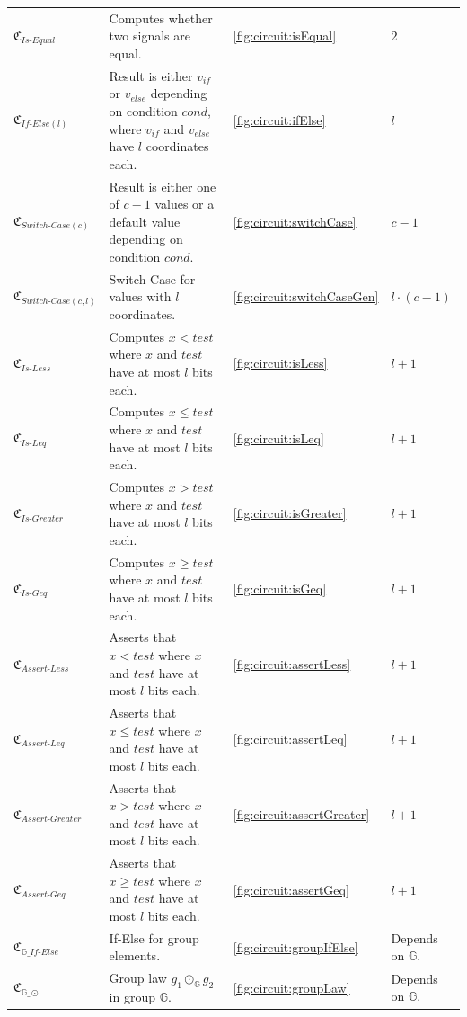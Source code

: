 \begin{longtable}{|L{4cm}|L{5.5cm}|L{1.3cm}|L{3cm}|}
    \hline
    $\mathfrak{C}_{Is\text{-}Equal}$ & Computes whether two signals are equal. & \cref{fig:circuit:isEqual} & $2$\\
    $\mathfrak{C}_{If\text{-}Else(l)}$ & Result is either $v_{if}$ or $v_{else}$ depending on condition $cond$, where $v_{if}$ and $v_{else}$ have $l$ coordinates each. & \cref{fig:circuit:ifElse} & $l$\\
    $\mathfrak{C}_{Switch\text{-}Case(c)}$ & Result is either one of $c-1$ values or a default value depending on condition $cond$. & \cref{fig:circuit:switchCase} & $c-1$\\
    $\mathfrak{C}_{Switch\text{-}Case(c,l)}$ & Switch-Case for values with $l$ coordinates. & \cref{fig:circuit:switchCaseGen} & $l\cdot(c-1)$\\
    $\mathfrak{C}_{Is\text{-}Less}$ & Computes $x<test$ where $x$ and $test$ have at most $l$ bits each. & \cref{fig:circuit:isLess} & $l+1$\\
    $\mathfrak{C}_{Is\text{-}Leq}$ & Computes $x\leq test$ where $x$ and $test$ have at most $l$ bits each. & \cref{fig:circuit:isLeq} & $l+1$\\
    $\mathfrak{C}_{Is\text{-}Greater}$ & Computes $x>test$ where $x$ and $test$ have at most $l$ bits each. & \cref{fig:circuit:isGreater} & $l+1$\\
    $\mathfrak{C}_{Is\text{-}Geq}$ & Computes $x\geq test$ where $x$ and $test$ have at most $l$ bits each. & \cref{fig:circuit:isGeq} & $l+1$\\
    $\mathfrak{C}_{Assert\text{-}Less}$ & Asserts that $x<test$ where $x$ and $test$ have at most $l$ bits each. & \cref{fig:circuit:assertLess} & $l+1$\\
    $\mathfrak{C}_{Assert\text{-}Leq}$ & Asserts that $x\leq test$ where $x$ and $test$ have at most $l$ bits each. & \cref{fig:circuit:assertLeq} & $l+1$\\
    $\mathfrak{C}_{Assert\text{-}Greater}$ & Asserts that $x>test$ where $x$ and $test$ have at most $l$ bits each. & \cref{fig:circuit:assertGreater} & $l+1$\\
    $\mathfrak{C}_{Assert\text{-}Geq}$ & Asserts that $x\geq test$ where $x$ and $test$ have at most $l$ bits each. & \cref{fig:circuit:assertGeq} & $l+1$\\
    \hline
    $\mathfrak{C}_{\mathbb{G}\_If\text{-}Else}$ & If-Else for group elements. & \cref{fig:circuit:groupIfElse} & Depends on $\mathbb{G}$.\\
    $\mathfrak{C}_{\mathbb{G}\_\odot}$ & Group law $g_1 \odot_{\mathbb{G}} g_2$ in group $\mathbb{G}$. & \cref{fig:circuit:groupLaw} & Depends on $\mathbb{G}$.\\

\end{longtable}
